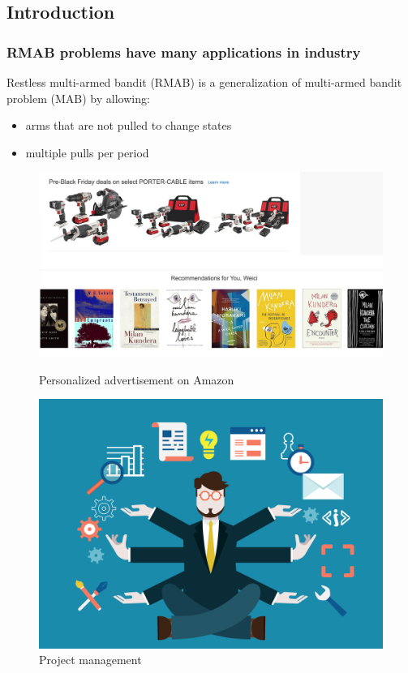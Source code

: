 \documentclass{beamer}
\begin{document}
\subsection{Introduction}
\begin{frame}[plain]
\frametitle{RMAB problems have many applications in industry}
Restless multi-armed bandit (RMAB) is a generalization of multi-armed bandit problem (MAB) by allowing:
\begin{itemize}
\item arms that are not pulled to change states
\item multiple pulls per period
\end{itemize}
\begin{figure}[!tbp]
  \centering
  \begin{minipage}[b]{0.55\textwidth}
    \includegraphics[width=\textwidth]{ads.png}
    \caption{Personalized advertisement on Amazon}
  \end{minipage}
  \hfill
  \begin{minipage}[b]{0.4\textwidth}
    \includegraphics[width=\textwidth]{project_management.jpg}
    \caption{Project management}
  \end{minipage}
\end{figure}
\end{frame}
\end{document}

